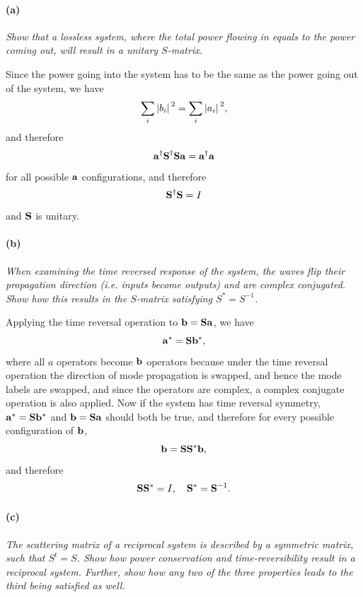 \documentclass[hyperref, a4paper]{article}
\begin{document}
\paragraph*{(a)} \textit{Show that a lossless system, where the total power flowing in equals to the power coming out, will result in a unitary $S$-matrix.} 

Since the power going into the system has to be the same as the power going out of the system, we have 
\[
    \sum_i \abs*{b_i}^2 = \sum_i \abs*{a_i}^2, 
\]
and therefore 
\[
    \vb{a}^\dagger \vb{S}^\dagger \vb{S} \vb{a} = \vb{a}^\dagger \vb{a}
\]
for all possible $\vb{a}$ configurations, and therefore 
\begin{equation}
    \vb{S}^\dagger \vb{S} = I 
\end{equation}
and $\vb{S}$ is unitary.

\paragraph*{(b)} \textit{When examining the time reversed response of the system, the waves flip their propagation direction (i.e. inputs become outputs) and are complex conjugated. Show how this results in the $S$-matrix satisfying $S^*=S^{-1}$.} 

Applying the time reversal operation to $\vb{b} = \vb{S} \vb{a}$, we have 
\[
    \vb{a}^* = \vb{S} \vb{b}^*,
\]
where all $a$ operators become $\vb{b}$ operators 
because under the time reversal operation the direction of mode propagation is swapped, 
and hence the mode labels are swapped, 
and since the operators are complex, 
a complex conjugate operation is also applied.
Now if the system has time reversal symmetry, 
$\vb{a}^* = \vb{S} \vb{b}^*$ and $\vb{b} = \vb{S} \vb{a}$ should both be true, 
and therefore for every possible configuration of $\vb{b}$, 
\[
    \vb{b} = \vb{S} \vb{S}^* \vb{b},
\] 
and therefore 
\begin{equation}
    \vb{S} \vb{S}^* = I , \quad \vb{S}^* = \vb{S}^{-1}.
\end{equation}

\paragraph*{(c)} \textit{The scattering matrix of a reciprocal system is described by a symmetric matrix, such that $S^t=S$. Show how power conservation and time-reversibility result in a reciprocal system. Further, show how any two of the three properties leads to the third being satisfied as well.} 
\end{document}
